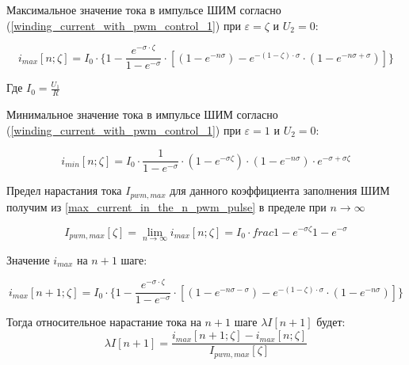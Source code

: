 Максимальное значение тока в импульсе ШИМ согласно (\ref{winding_current_with_pwm_control_1}) при
$\varepsilon=\zeta$ и $U_{2}=0$:

\begin{equation}
    \label{max_current_in_the_n_pwm_pulse}
    i_{max}[n; \zeta] =
        I_{0} 
            \cdot \{ 1 
                     - \frac{ e^{-\sigma \cdot \zeta} }{ 1 - e^{-\sigma} }
                       \cdot [ (1 - e^{-n\sigma})
                               - e^{ -(1 - \zeta) \cdot \sigma }
                                    \cdot ( 1 - e^{-n\sigma + \sigma} )
                             ]
                  \}
\end{equation}

Где $I_0 = \frac{ U_{1} }{ R }$ 

Минимальное значение тока в импульсе ШИМ согласно (\ref{winding_current_with_pwm_control_1}) при
$\varepsilon=1$ и $U_{2}=0$:

\begin{equation}
    \label{min_current_in_the_n_pwm_pulse}
    i_{min}[n; \zeta] =
        I_{0} 
            \cdot \frac{ 1 }{ 1-e^{-\sigma} }
            \cdot (1 - e^{-\sigma\zeta})
            \cdot (1 - e^{-n\sigma})
            \cdot e^{-\sigma + \sigma\zeta} 
\end{equation}

Предел нарастания тока $I_{pwm,max}$ для данного коэффициента заполнения ШИМ получим из
\ref{max_current_in_the_n_pwm_pulse} в пределе при $n \to \infty$

\begin{equation}
    \label{asymptote_of_current_within_constol_pulse}
    I_{pwm,max}[\zeta]= 
        \lim_{n \to \infty}i_{max}[n; \zeta] = 
            I_{0} \cdot frac{ 1 - e^{-\sigma\zeta} }{ 1 - e^{-\sigma}}
\end{equation}

Значение $i_{max}$ на $n+1$ шаге:

$$
    i_{max}[n+1; \zeta] =
        I_{0} 
            \cdot \{ 1 
                     - \frac{ e^{-\sigma \cdot \zeta} }{ 1 - e^{-\sigma} }
                       \cdot [ (1 - e^{-n\sigma - \sigma})
                               - e^{ -(1 - \zeta) \cdot \sigma }
                                    \cdot ( 1 - e^{-n\sigma} )
                             ]
                  \}
$$

Тогда относительное нарастание тока на $n+1$ шаге $\lambda I[n+1]$ будет:
$$
    \lambda I[n+1] = 
        \frac{ i_{max}[n+1; \zeta] - i_{max}[n; \zeta] }{ I_{pwm,max}[\zeta] }
$$

